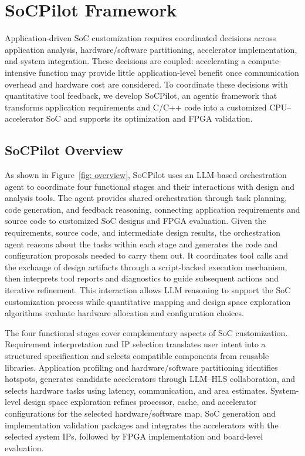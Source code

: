 \section{SoCPilot Framework}
Application-driven SoC customization requires coordinated decisions across application analysis, hardware/software partitioning, accelerator implementation, and system integration. These decisions are coupled: accelerating a compute-intensive function may provide little application-level benefit once communication overhead and hardware cost are considered. To coordinate these decisions with quantitative tool feedback, we develop SoCPilot, an agentic framework that transforms application requirements and C/C++ code into a customized CPU--accelerator SoC and supports its optimization and FPGA validation.

\subsection{SoCPilot Overview}
\label{sec:socpilot-overview}
As shown in Figure~\ref{fig: overview}, SoCPilot uses an LLM-based orchestration agent to coordinate four functional stages and their interactions with design and analysis tools. The agent provides shared orchestration through task planning, code generation, and feedback reasoning, connecting application requirements and source code to customized SoC designs and FPGA evaluation. Given the requirements, source code, and intermediate design results, the orchestration agent reasons about the tasks within each stage and generates the code and configuration proposals needed to carry them out. It coordinates tool calls and the exchange of design artifacts through a script-backed execution mechanism, then interprets tool reports and diagnostics to guide subsequent actions and iterative refinement. This interaction allows LLM reasoning to support the SoC customization process while quantitative mapping and design space exploration algorithms evaluate hardware allocation and configuration choices.

The four functional stages cover complementary aspects of SoC customization. Requirement interpretation and IP selection translates user intent into a structured specification and selects compatible components from reusable libraries. Application profiling and hardware/software partitioning identifies hotspots, generates candidate accelerators through LLM--HLS collaboration, and selects hardware tasks using latency, communication, and area estimates. System-level design space exploration refines processor, cache, and accelerator configurations for the selected hardware/software map. SoC generation and implementation validation packages and integrates the accelerators with the selected system IPs, followed by FPGA implementation and board-level evaluation.


